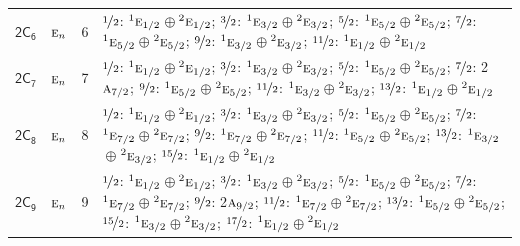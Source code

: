 \documentclass[10pt,a4paper]{article}
\numberwithin{equation}{section}
\newcommand{\grp}[1]{\mathsf{#1}}
\newcommand{\irr}[1]{\text{\normalfont\scshape #1}}
\newcommand{\conjpair}[1]{{}^{#1}}
\newlength{\fillwidth}\newlength{\cellwidth}\newlength{\colwidth}
\begin{document}
{\begin{longtable}{@{}llr>{\RaggedRight\arraybackslash}p{\fillwidth}@{}}
\href{2C6.pdf}{$\grp{2C_{6}}$} & $\irr{e}_{n}$ & 6 & $\nicefrac{1}{2}$: $\conjpair{1}\irr{e}_{1/2}$${}\oplus{}$$\conjpair{2}\irr{e}_{1/2}$; $\nicefrac{3}{2}$: $\conjpair{1}\irr{e}_{3/2}$${}\oplus{}$$\conjpair{2}\irr{e}_{3/2}$; $\nicefrac{5}{2}$: $\conjpair{1}\irr{e}_{5/2}$${}\oplus{}$$\conjpair{2}\irr{e}_{5/2}$; $\nicefrac{7}{2}$: $\conjpair{1}\irr{e}_{5/2}$${}\oplus{}$$\conjpair{2}\irr{e}_{5/2}$; $\nicefrac{9}{2}$: $\conjpair{1}\irr{e}_{3/2}$${}\oplus{}$$\conjpair{2}\irr{e}_{3/2}$; $\nicefrac{11}{2}$: $\conjpair{1}\irr{e}_{1/2}$${}\oplus{}$$\conjpair{2}\irr{e}_{1/2}$\\
\href{2C7.pdf}{$\grp{2C_{7}}$} & $\irr{e}_{n}$ & 7 & $\nicefrac{1}{2}$: $\conjpair{1}\irr{e}_{1/2}$${}\oplus{}$$\conjpair{2}\irr{e}_{1/2}$; $\nicefrac{3}{2}$: $\conjpair{1}\irr{e}_{3/2}$${}\oplus{}$$\conjpair{2}\irr{e}_{3/2}$; $\nicefrac{5}{2}$: $\conjpair{1}\irr{e}_{5/2}$${}\oplus{}$$\conjpair{2}\irr{e}_{5/2}$; $\nicefrac{7}{2}$: 2$\irr{a}_{7/2}$; $\nicefrac{9}{2}$: $\conjpair{1}\irr{e}_{5/2}$${}\oplus{}$$\conjpair{2}\irr{e}_{5/2}$; $\nicefrac{11}{2}$: $\conjpair{1}\irr{e}_{3/2}$${}\oplus{}$$\conjpair{2}\irr{e}_{3/2}$; $\nicefrac{13}{2}$: $\conjpair{1}\irr{e}_{1/2}$${}\oplus{}$$\conjpair{2}\irr{e}_{1/2}$\\
\href{2C8.pdf}{$\grp{2C_{8}}$} & $\irr{e}_{n}$ & 8 & $\nicefrac{1}{2}$: $\conjpair{1}\irr{e}_{1/2}$${}\oplus{}$$\conjpair{2}\irr{e}_{1/2}$; $\nicefrac{3}{2}$: $\conjpair{1}\irr{e}_{3/2}$${}\oplus{}$$\conjpair{2}\irr{e}_{3/2}$; $\nicefrac{5}{2}$: $\conjpair{1}\irr{e}_{5/2}$${}\oplus{}$$\conjpair{2}\irr{e}_{5/2}$; $\nicefrac{7}{2}$: $\conjpair{1}\irr{e}_{7/2}$${}\oplus{}$$\conjpair{2}\irr{e}_{7/2}$; $\nicefrac{9}{2}$: $\conjpair{1}\irr{e}_{7/2}$${}\oplus{}$$\conjpair{2}\irr{e}_{7/2}$; $\nicefrac{11}{2}$: $\conjpair{1}\irr{e}_{5/2}$${}\oplus{}$$\conjpair{2}\irr{e}_{5/2}$; $\nicefrac{13}{2}$: $\conjpair{1}\irr{e}_{3/2}$${}\oplus{}$$\conjpair{2}\irr{e}_{3/2}$; $\nicefrac{15}{2}$: $\conjpair{1}\irr{e}_{1/2}$${}\oplus{}$$\conjpair{2}\irr{e}_{1/2}$\\
\href{2C9.pdf}{$\grp{2C_{9}}$} & $\irr{e}_{n}$ & 9 & $\nicefrac{1}{2}$: $\conjpair{1}\irr{e}_{1/2}$${}\oplus{}$$\conjpair{2}\irr{e}_{1/2}$; $\nicefrac{3}{2}$: $\conjpair{1}\irr{e}_{3/2}$${}\oplus{}$$\conjpair{2}\irr{e}_{3/2}$; $\nicefrac{5}{2}$: $\conjpair{1}\irr{e}_{5/2}$${}\oplus{}$$\conjpair{2}\irr{e}_{5/2}$; $\nicefrac{7}{2}$: $\conjpair{1}\irr{e}_{7/2}$${}\oplus{}$$\conjpair{2}\irr{e}_{7/2}$; $\nicefrac{9}{2}$: 2$\irr{a}_{9/2}$; $\nicefrac{11}{2}$: $\conjpair{1}\irr{e}_{7/2}$${}\oplus{}$$\conjpair{2}\irr{e}_{7/2}$; $\nicefrac{13}{2}$: $\conjpair{1}\irr{e}_{5/2}$${}\oplus{}$$\conjpair{2}\irr{e}_{5/2}$; $\nicefrac{15}{2}$: $\conjpair{1}\irr{e}_{3/2}$${}\oplus{}$$\conjpair{2}\irr{e}_{3/2}$; $\nicefrac{17}{2}$: $\conjpair{1}\irr{e}_{1/2}$${}\oplus{}$$\conjpair{2}\irr{e}_{1/2}$\\

\end{longtable}}
\end{document}
